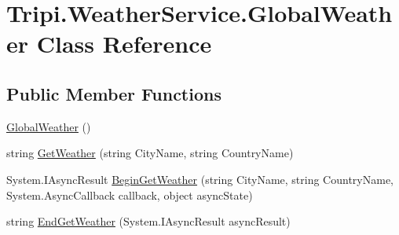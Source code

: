\hypertarget{class_tripi_1_1_weather_service_1_1_global_weather}{
\section{Tripi.WeatherService.GlobalWeather Class Reference}
\label{class_tripi_1_1_weather_service_1_1_global_weather}
}


 
\subsection*{Public Member Functions}
\begin{DoxyCompactItemize}
\item 
\hypertarget{class_tripi_1_1_weather_service_1_1_global_weather_ab9f4fc6882bb1e6ec3dbd323daf8f9c0}{
\hyperlink{class_tripi_1_1_weather_service_1_1_global_weather_ab9f4fc6882bb1e6ec3dbd323daf8f9c0}{GlobalWeather} ()}
\label{class_tripi_1_1_weather_service_1_1_global_weather_ab9f4fc6882bb1e6ec3dbd323daf8f9c0}

\begin{DoxyCompactList}\small\item\em \item\end{DoxyCompactList}\item 
\hypertarget{class_tripi_1_1_weather_service_1_1_global_weather_a0f3f73e8902d82aacc3caf3166254865}{
string \hyperlink{class_tripi_1_1_weather_service_1_1_global_weather_a0f3f73e8902d82aacc3caf3166254865}{GetWeather} (string CityName, string CountryName)}
\label{class_tripi_1_1_weather_service_1_1_global_weather_a0f3f73e8902d82aacc3caf3166254865}

\begin{DoxyCompactList}\small\item\em \item\end{DoxyCompactList}\item 
\hypertarget{class_tripi_1_1_weather_service_1_1_global_weather_a27ee4b99cb4c2b1c808be9c3633f3906}{
System.IAsyncResult \hyperlink{class_tripi_1_1_weather_service_1_1_global_weather_a27ee4b99cb4c2b1c808be9c3633f3906}{BeginGetWeather} (string CityName, string CountryName, System.AsyncCallback callback, object asyncState)}
\label{class_tripi_1_1_weather_service_1_1_global_weather_a27ee4b99cb4c2b1c808be9c3633f3906}

\begin{DoxyCompactList}\small\item\em \item\end{DoxyCompactList}\item 
\hypertarget{class_tripi_1_1_weather_service_1_1_global_weather_afbe73d92c5ba43fa7c0bf127f20a1d65}{
string \hyperlink{class_tripi_1_1_weather_service_1_1_global_weather_afbe73d92c5ba43fa7c0bf127f20a1d65}{EndGetWeather} (System.IAsyncResult asyncResult)}
\label{class_tripi_1_1_weather_service_1_1_global_weather_afbe73d92c5ba43fa7c0bf127f20a1d65}


\end{DoxyCompactItemize}
